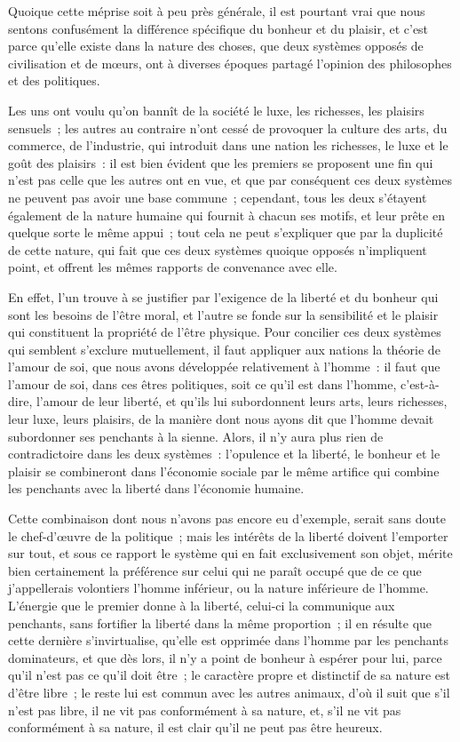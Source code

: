 \documentclass[french,twoside]{book} %
\begin{document}
Quoique cette méprise soit à peu près générale, il est pourtant vrai que nous sentons confusément la différence spécifique du bonheur et du plaisir, et c’est parce qu’elle existe dans la nature des choses, que deux systèmes opposés de civilisation et de mœurs, ont à diverses époques partagé l’opinion des philosophes et des politiques.\par
Les uns ont voulu qu’on bannît de la société le luxe, les richesses, les plaisirs sensuels ; les autres au contraire n’ont cessé de provoquer la culture des arts, du commerce, de l’industrie, qui introduit dans une nation les richesses, le luxe et le goût des plaisirs : il est bien évident que les premiers se proposent une fin qui n’est pas celle que les autres ont en vue, et que par conséquent ces deux systèmes ne peuvent pas avoir une base commune ; cependant, tous les deux s’étayent également de la nature humaine qui fournit à chacun ses motifs, et leur prête en quelque sorte le même appui ; tout cela ne peut s’expliquer que par la duplicité de cette nature, qui fait que ces deux systèmes quoique opposés n’impliquent point, et offrent les mêmes rapports de convenance avec elle.\par
En effet, l’un trouve à se justifier par l’exigence de la liberté et du bonheur qui sont les besoins de l’être moral, et l’autre se fonde sur la sensibilité et le plaisir qui constituent la propriété de l’être physique. Pour concilier ces deux systèmes qui semblent s’exclure mutuellement, il faut appliquer aux nations la théorie de l’amour de soi, que nous avons développée relativement à l’homme : il faut que l’amour de soi, dans ces êtres politiques, soit ce qu’il est dans l’homme, c’est-à-dire, l’amour de leur liberté, et qu’ils lui subordonnent leurs arts, leurs richesses, leur luxe, leurs plaisirs, de la manière dont nous ayons dit que l’homme devait subordonner ses penchants à la sienne. Alors, il n’y aura plus rien de contradictoire dans les deux systèmes : l’opulence et la liberté, le bonheur et le plaisir se combineront dans l’économie sociale par le même artifice qui combine les penchants avec la liberté dans l’économie humaine.\par
Cette combinaison dont nous n’avons pas encore eu d’exemple, serait sans doute le chef-d’œuvre de la politique ; mais les intérêts de la liberté doivent l’emporter sur tout, et sous ce rapport le système qui en fait exclusivement son objet, mérite bien certainement la préférence sur celui qui ne paraît occupé que de ce que j’appellerais volontiers l’homme inférieur, ou la nature inférieure de l’homme. L’énergie que le premier donne à la liberté, celui-ci la communique aux penchants, sans fortifier la liberté dans la même proportion ; il en résulte que cette dernière s’invirtualise, qu’elle est opprimée dans l’homme par les penchants dominateurs, et que dès lors, il n’y a point de bonheur à espérer pour lui, parce qu’il n’est pas ce qu’il doit être ; le caractère propre et distinctif de sa nature est d’être libre ; le reste lui est commun avec les autres animaux, d’où il suit que s’il n’est pas libre, il ne vit pas conformément à sa nature, et, s’il ne vit pas conformément à sa nature, il est clair qu’il ne peut pas être heureux.\par
\end{document}
